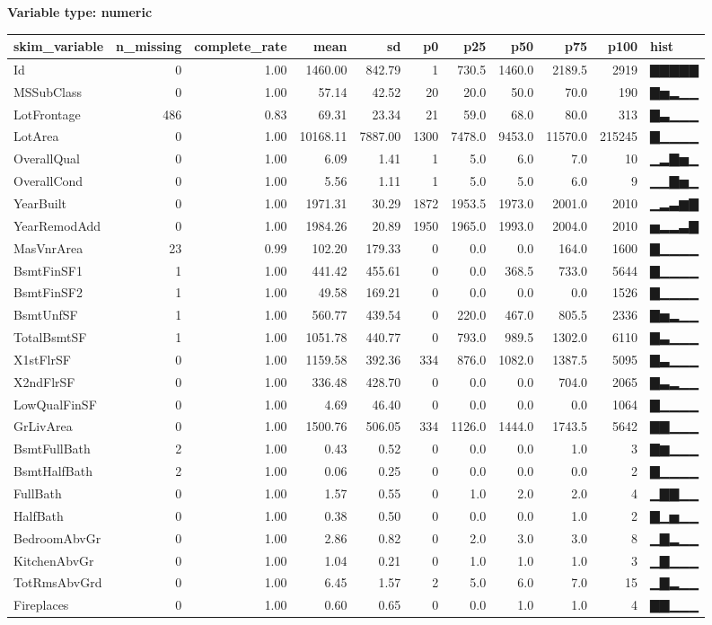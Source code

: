 \documentclass[
]{article}
\begin{document}
\textbf{Variable type: numeric}

\begin{longtable}[]{@{}lrrrrrrrrrl@{}}
\toprule
skim\_variable & n\_missing & complete\_rate & mean & sd & p0 & p25 &
p50 & p75 & p100 & hist\tabularnewline
\midrule
\endhead
Id & 0 & 1.00 & 1460.00 & 842.79 & 1 & 730.5 & 1460.0 & 2189.5 & 2919 &
▇▇▇▇▇\tabularnewline
MSSubClass & 0 & 1.00 & 57.14 & 42.52 & 20 & 20.0 & 50.0 & 70.0 & 190 &
▇▅▂▁▁\tabularnewline
LotFrontage & 486 & 0.83 & 69.31 & 23.34 & 21 & 59.0 & 68.0 & 80.0 & 313
& ▇▃▁▁▁\tabularnewline
LotArea & 0 & 1.00 & 10168.11 & 7887.00 & 1300 & 7478.0 & 9453.0 &
11570.0 & 215245 & ▇▁▁▁▁\tabularnewline
OverallQual & 0 & 1.00 & 6.09 & 1.41 & 1 & 5.0 & 6.0 & 7.0 & 10 &
▁▂▇▅▁\tabularnewline
OverallCond & 0 & 1.00 & 5.56 & 1.11 & 1 & 5.0 & 5.0 & 6.0 & 9 &
▁▁▇▅▁\tabularnewline
YearBuilt & 0 & 1.00 & 1971.31 & 30.29 & 1872 & 1953.5 & 1973.0 & 2001.0
& 2010 & ▁▂▃▆▇\tabularnewline
YearRemodAdd & 0 & 1.00 & 1984.26 & 20.89 & 1950 & 1965.0 & 1993.0 &
2004.0 & 2010 & ▅▂▂▃▇\tabularnewline
MasVnrArea & 23 & 0.99 & 102.20 & 179.33 & 0 & 0.0 & 0.0 & 164.0 & 1600
& ▇▁▁▁▁\tabularnewline
BsmtFinSF1 & 1 & 1.00 & 441.42 & 455.61 & 0 & 0.0 & 368.5 & 733.0 & 5644
& ▇▁▁▁▁\tabularnewline
BsmtFinSF2 & 1 & 1.00 & 49.58 & 169.21 & 0 & 0.0 & 0.0 & 0.0 & 1526 &
▇▁▁▁▁\tabularnewline
BsmtUnfSF & 1 & 1.00 & 560.77 & 439.54 & 0 & 220.0 & 467.0 & 805.5 &
2336 & ▇▅▂▁▁\tabularnewline
TotalBsmtSF & 1 & 1.00 & 1051.78 & 440.77 & 0 & 793.0 & 989.5 & 1302.0 &
6110 & ▇▃▁▁▁\tabularnewline
X1stFlrSF & 0 & 1.00 & 1159.58 & 392.36 & 334 & 876.0 & 1082.0 & 1387.5
& 5095 & ▇▃▁▁▁\tabularnewline
X2ndFlrSF & 0 & 1.00 & 336.48 & 428.70 & 0 & 0.0 & 0.0 & 704.0 & 2065 &
▇▃▂▁▁\tabularnewline
LowQualFinSF & 0 & 1.00 & 4.69 & 46.40 & 0 & 0.0 & 0.0 & 0.0 & 1064 &
▇▁▁▁▁\tabularnewline
GrLivArea & 0 & 1.00 & 1500.76 & 506.05 & 334 & 1126.0 & 1444.0 & 1743.5
& 5642 & ▇▇▁▁▁\tabularnewline
BsmtFullBath & 2 & 1.00 & 0.43 & 0.52 & 0 & 0.0 & 0.0 & 1.0 & 3 &
▇▆▁▁▁\tabularnewline
BsmtHalfBath & 2 & 1.00 & 0.06 & 0.25 & 0 & 0.0 & 0.0 & 0.0 & 2 &
▇▁▁▁▁\tabularnewline
FullBath & 0 & 1.00 & 1.57 & 0.55 & 0 & 1.0 & 2.0 & 2.0 & 4 &
▁▇▇▁▁\tabularnewline
HalfBath & 0 & 1.00 & 0.38 & 0.50 & 0 & 0.0 & 0.0 & 1.0 & 2 &
▇▁▅▁▁\tabularnewline
BedroomAbvGr & 0 & 1.00 & 2.86 & 0.82 & 0 & 2.0 & 3.0 & 3.0 & 8 &
▁▇▂▁▁\tabularnewline
KitchenAbvGr & 0 & 1.00 & 1.04 & 0.21 & 0 & 1.0 & 1.0 & 1.0 & 3 &
▁▇▁▁▁\tabularnewline
TotRmsAbvGrd & 0 & 1.00 & 6.45 & 1.57 & 2 & 5.0 & 6.0 & 7.0 & 15 &
▁▇▂▁▁\tabularnewline
Fireplaces & 0 & 1.00 & 0.60 & 0.65 & 0 & 0.0 & 1.0 & 1.0 & 4 &
▇▇▁▁▁\tabularnewline

\end{longtable}
\end{document}
